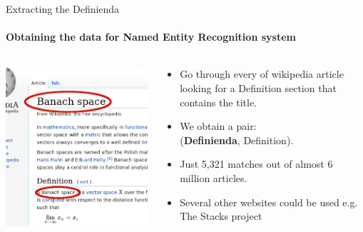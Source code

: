 \documentclass[10pt]{beamer}
\begin{document}
\begin{frame}{Extracting the Definienda}
    \framesubtitle{Obtaining the data for Named Entity Recognition system}
    \begin{columns}[T]
        \begin{column}{0.5\textwidth}
    \includegraphics[width=\textwidth]{wiki_thin_banach.png}
        \end{column}
        \begin{column}{0.5\textwidth}
            \begin{itemize}
            \item Go through every of wikipedia article looking for a Definition section that contains the title.
            \item We obtain a pair:\\
                (\textbf{Definienda},  Definition).
            \item Just 5,321 matches out of almost 6 million articles.
            \item Several other websites could be used e.g. The Stacks project
            \end{itemize}
        \end{column}
    \end{columns}
\end{frame}
\end{document}
